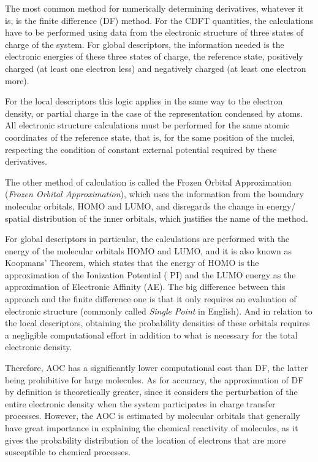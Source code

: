 \documentclass[a4paper,11pt]{refart}
\begin{document}
	The most common method for numerically determining derivatives, whatever it is, is the finite difference (DF) method. For the CDFT quantities, the calculations have to be performed using data from the electronic structure of three states of charge of the system. For global descriptors, the information needed is the electronic energies of these three states of charge, the reference state, positively charged (at least one electron less) and negatively charged (at least one electron more).

	For the local descriptors this logic applies in the same way to the electron density, or partial charge in the case of the representation condensed by atoms. All electronic structure calculations must be performed for the same atomic coordinates of the reference state, that is, for the same position of the nuclei, respecting the condition of constant external potential required by these derivatives.

	The other method of calculation is called the Frozen Orbital Approximation (\textit{Frozen Orbital Approximation})\cite{yang1984electron}, which uses the information from the boundary molecular orbitals, HOMO and LUMO, and disregards the change in energy/ spatial distribution of the inner orbitals, which justifies the name of the method.

	For global descriptors in particular, the calculations are performed with the energy of the molecular orbitals HOMO and LUMO, and it is also known as Koopmans' Theorem\cite{manne1970koopmans}, which states that the energy of HOMO is the approximation of the Ionization Potential ( PI) and the LUMO energy as the approximation of Electronic Affinity (AE). The big difference between this approach and the finite difference one is that it only requires an evaluation of electronic structure (commonly called \textit{Single Point} in English). And in relation to the local descriptors, obtaining the probability densities of these orbitals requires a negligible computational effort in addition to what is necessary for the total electronic density.

	Therefore, AOC has a significantly lower computational cost than DF, the latter being prohibitive for large molecules. As for accuracy, the approximation of DF by definition is theoretically greater, since it considers the perturbation of the entire electronic density when the system participates in charge transfer processes. However, the AOC is estimated by molecular orbitals that generally have great importance in explaining the chemical reactivity of molecules, as it gives the probability distribution of the location of electrons that are more susceptible to chemical processes.
\end{document}
